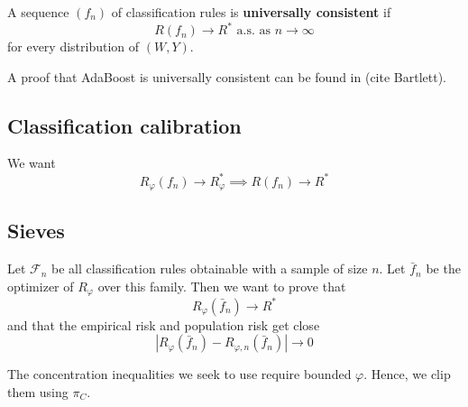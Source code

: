A sequence $(f_n)$ of classification rules is \textbf{universally consistent} if
\begin{equation}
	\label{eq:universally_consistent}
	R(f_n) \to R^* \text{ a.s. as } n \to \infty
\end{equation}
for every distribution of $(W, Y)$.

A proof that AdaBoost is universally consistent can be found in (cite Bartlett).

\subsection{Classification calibration}
We want
\begin{equation*}
	R_\varphi (f_n) \to R^*_\varphi \implies R(f_n) \to R^*
\end{equation*}

\subsection{Sieves}
Let $\mathcal{F}_n$ be all classification rules obtainable with a sample of size $n$. Let $\bar{f}_n$ be the optimizer of $R_\varphi$ over this family. Then we want to prove that
\begin{equation}
	R_\varphi(\bar{f}_n) \to R^*
\end{equation}
and that the empirical risk and population risk get close
\begin{equation}
	|R_\varphi(\bar{f}_n) - R_{\varphi, n}(\bar{f}_n)| \to 0
\end{equation}

The concentration inequalities we seek to use require bounded $\varphi$. Hence, we clip them using $\pi_C$.












